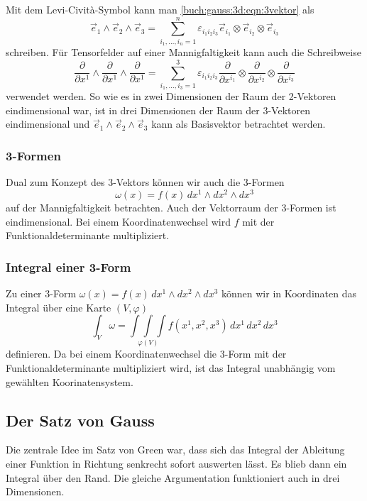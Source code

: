 Mit dem Levi-Cività-Symbol kann man 
\eqref{buch:gauss:3d:eqn:3vektor}
als
\[
\vec{e}_1
\wedge
\vec{e}_2
\wedge
\vec{e}_3
=
\sum_{i_1,\dots,i_n=1}^n
\varepsilon_{i_1 i_2 i_3}
\vec{e}_{i_1}
\otimes
\vec{e}_{i_2}
\otimes
\vec{e}_{i_3}
\]
schreiben.
Für Tensorfelder auf einer Mannigfaltigkeit kann auch die Schreibweise
\[
\frac{\partial}{\partial x^1}
\wedge
\frac{\partial}{\partial x^1}
\wedge
\frac{\partial}{\partial x^1}
=
\sum_{i_1,\dots,i_3=1}^3
\varepsilon_{i_1 i_2 i_3}
\frac{\partial}{\partial x^{i_1}}
\otimes
\frac{\partial}{\partial x^{i_2}}
\otimes
\frac{\partial}{\partial x^{i_3}}
\]
verwendet werden.
So wie es in zwei Dimensionen der Raum der 2-Vektoren eindimensional
war, ist in drei Dimensionen der Raum der 3-Vektoren eindimensional
und $\vec{e}_1\wedge\vec{e}_2\wedge\vec{e}_3$ kann als Basisvektor
betrachtet werden.

%
%
\subsubsection{3-Formen}
Dual zum Konzept des 3-Vektors können wir auch die 3-Formen
\[
\omega(x)
=
f(x)
\,
dx^1 \wedge dx^2 \wedge dx^3
\]
auf der Mannigfaltigkeit betrachten.
Auch der Vektorraum der 3-Formen ist eindimensional.
Bei einem Koordinatenwechsel wird $f$ mit der Funktionaldeterminante
multipliziert.

%
%
\subsubsection{Integral einer 3-Form}
Zu einer 3-Form $\omega(x)=f(x)\,dx^1\wedge dx^2\wedge dx^3$ können wir 
in Koordinaten das Integral über eine Karte $(V,\varphi)$
\[
\int_{V} \omega
=
\underset{\varphi(V)}{\displaystyle\int\!\!\!\int\!\!\!\int}
f(x^1,x^2,x^3)
\,
dx^1\,dx^2\,dx^3
\]
definieren.
Da bei einem Koordinatenwechsel die 3-Form mit der Funktionaldeterminante
multipliziert wird, ist das Integral unabhängig vom gewählten
Koorinatensystem.

%
%
\subsection{Der Satz von Gauss}

Die zentrale Idee im Satz von Green war, dass sich das Integral
der Ableitung einer Funktion in Richtung senkrecht sofort auswerten
lässt.
Es blieb dann ein Integral über den Rand.
Die gleiche Argumentation funktioniert auch in drei Dimensionen.

